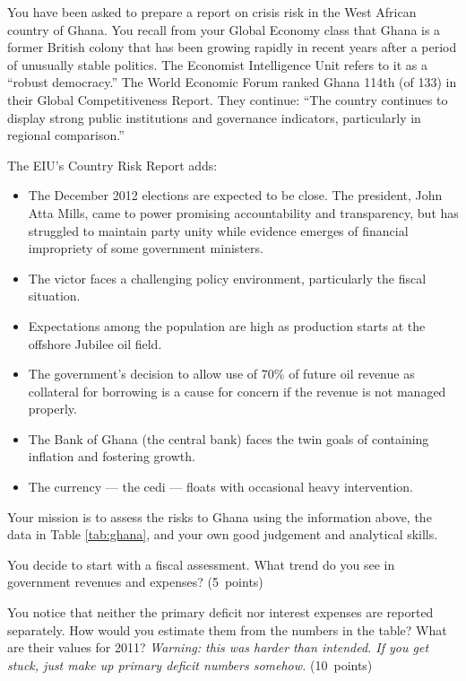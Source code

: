 \documentclass[letterpaper,12pt]{exam}
\begin{document}
\begin{questions}
You have been asked to prepare a report on crisis risk in
the West African country of Ghana.
You recall from your Global Economy class that
Ghana is a former British colony that has been growing rapidly
in recent years after a period of unusually stable politics.
The Economist Intelligence Unit refers to it as a ``robust democracy.''
The World Economic Forum ranked Ghana 114th (of 133)
in their Global Competitiveness Report.
They continue:
``The country continues to display strong public institutions and
governance indicators,
particularly in regional comparison.''

The EIU's Country Risk Report adds:
\begin{itemize}
\item The December 2012 elections are expected to be close.
The president, John Atta Mills, came to power promising accountability
and transparency, but  has struggled to maintain party unity
while evidence emerges of financial impropriety of some government ministers.
\item The victor faces a challenging policy environment, particularly
the fiscal situation.
\item Expectations among the population are high as production
starts at the offshore Jubilee oil field.
\item The government's decision to allow use of 70\% of future
oil revenue as collateral for borrowing is a cause for concern
if the revenue is not managed properly.
\item The Bank of Ghana (the central bank) faces the twin goals of
containing inflation and fostering growth.
\item The currency --- the cedi --- floats with occasional heavy intervention.
\end{itemize}
%
Your mission is to assess the risks to Ghana  using
the information above, the data in Table \ref{tab:ghana},
and your own good judgement and analytical skills.

\begin{parts}
\item  You decide to start with a fiscal assessment.
What trend do you see in government revenues and expenses?
(5~points)

\item You notice that neither the primary deficit nor
interest expenses are reported separately.
How would you estimate them from the numbers in the table?
What are their values for 2011?
{\it Warning: this was harder than intended. If you get stuck,
just make up primary deficit numbers somehow.\/}
(10~points)


\end{parts}
\end{questions}
\end{document}
